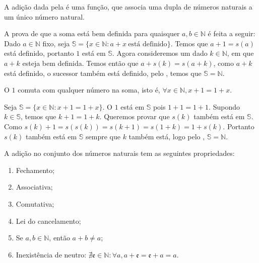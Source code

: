 \documentclass[../main.tex]{subfiles}
\begin{document}
\begin{teo}
    A adição dada pela  é uma função, que associa uma dupla de números naturais a um único número natural.
\end{teo}
\begin{dem}
    A prova de que a soma está bem definida para quaisquer $a,b \in \mathbb{N}$ é feita a seguir:
    Dado $a \in \mathbb{N}$ fixo, seja $\mathbb{S} = \{ x \in \mathbb{N} : a + x \ \text{está definido} \}$. Temos que $a + 1 = s(a)$ está definido, portanto $1$ está em $\mathbb{S}$. 
    Agora consideremos um dado $k \in \mathbb{N}$, em que $a+k$ esteja bem definida. Temos então que $a + s(k) = s(a+k)$, como $a+k$ está definido, o sucessor também está definido, pelo , temos que $\mathbb{S} = \mathbb{N}$.
\end{dem}
\begin{lema}\label{nat-lema-somaUmComuta}
    O $1$ comuta com qualquer número na soma, isto é, $ \forall x \in \mathbb{N}, x + 1 = 1 + x$.
\end{lema}
\begin{dem}
    Seja $\mathbb{S} = \{ x \in \mathbb{N} : x + 1 = 1 + x\}$. O $1$ está em $\mathbb{S}$ pois $1 + 1 = 1 + 1$.
    Supondo $k \in \mathbb{S}$, temos que $k+1 = 1+k$. Queremos provar que $s(k)$ também está em $\mathbb{S}$. Como
    $s(k) + 1 = s(s(k)) = s(k+1) = s(1+k) = 1 + s(k)$. Portanto $s(k)$ também está em $\mathbb{S}$ sempre que $k$ também está, logo pelo , $\mathbb{S} = \mathbb{N}$.
\end{dem}

\begin{prop}\label{nat-teo-somaPropriedades}
    A adição no conjunto dos números naturais tem as seguintes propriedades:
    \begin{enumerate}[label=(\roman*)]
        \item Fechamento;
    	\item Associativa;
    	\item Comutativa;
        \item Lei do cancelamento;
        \item Se $a,b \in \mathbb{N}$, então $a + b \neq a$;\label{nat-teo-AmaisBdiffA}
    	\item Inexistência de neutro: $\nexists \mathfrak{e} \in \mathbb{N} : \forall a, a + \mathfrak{e} = \mathfrak{e} + a = a$.
    \end{enumerate}
\end{prop}
\end{document}
